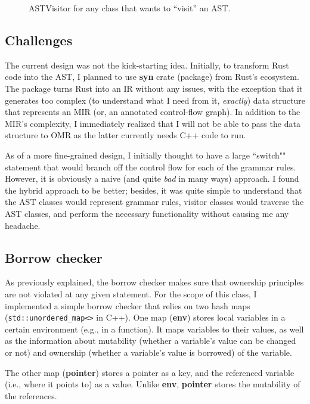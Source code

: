 \begin{figure*}[ht]
    \begin{center}
        
    \end{center}
    \caption{ASTVisitor for any class that wants to ``visit'' an AST.}
    \label{cpp2}
\end{figure*}

\subsection{Challenges}

The current design was not the kick-starting idea. Initially, to transform Rust
code into the AST, I planned to use \textbf{syn} crate (package) from Rust's
ecosystem.  The package turns Rust into an IR without any issues, with the
exception that it generates too complex (to understand what I need from it,
\textit{exactly}) data structure that represents an MIR (or, an annotated
control-flow graph). In addition to the MIR's complexity, I immediately
realized that I will not be able to pass the data structure
to OMR as the latter currently needs C++ code to run.

As of a more fine-grained design, I initially thought to have a large
``switch"" statement that would branch off the control flow for each of the
grammar rules. However, it is obviously a naive (and quite \textit{bad} in many
ways) approach. I found the hybrid approach to be better; besides, it was quite
simple to understand that the AST classes would represent grammar rules,
visitor classes would traverse the AST classes, and perform the necessary
functionality without causing me any headache.

\subsection{Borrow checker}

As previously explained, the borrow checker makes sure that
ownership principles are not violated at any given statement.
For the scope of this class, I implemented a simple borrow checker
that relies on two hash maps (\texttt{std::unordered\_map<>} in C++).
One map (\textbf{env}) stores local variables in a certain environment
(e.g., in a function). It maps variables to their values, as well as
the information about mutability (whether a variable's
value can be changed or not) and ownership (whether a variable's value is
borrowed) of the variable.

The other map (\textbf{pointer}) stores a pointer as a key, and the referenced
variable (i.e., where it points to) as a value. Unlike \textbf{env},
\textbf{pointer} stores the mutability of the references.

